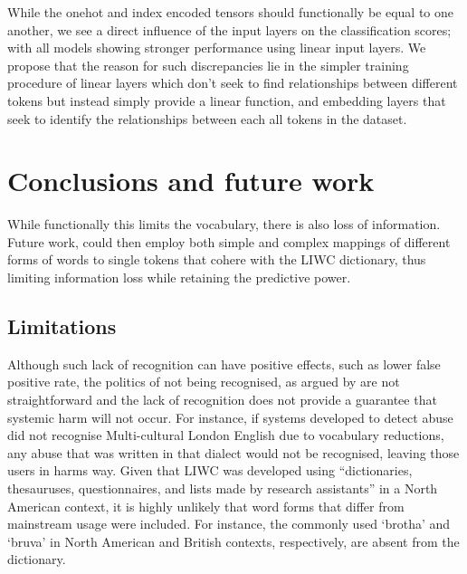 
While the onehot and index encoded tensors should functionally be equal to one another, we see a direct influence of the input layers on the classification scores; with all models showing stronger performance using linear input layers. We propose that the reason for such discrepancies lie in the simpler training procedure of linear layers which don't seek to find relationships between different tokens but instead simply provide a linear function, and embedding layers that seek to identify the relationships between each all tokens in the dataset.

\section{Conclusions and future work}

While functionally this limits the vocabulary, there is also loss of information. Future work, could then employ both simple and complex mappings of different forms of words to single tokens that cohere with the LIWC dictionary, thus limiting information loss while retaining the predictive power.

\subsection{Limitations}
Although such lack of recognition can have positive effects, such as lower false positive rate, the politics of not being recognised, as argued by \citet{Benjamin:2019} are not straightforward and the lack of recognition does not provide a guarantee that systemic harm will not occur. For instance, if systems developed to detect abuse did not recognise Multi-cultural London English due to vocabulary reductions, any abuse that was written in that dialect would not be recognised, leaving those users in harms way. Given that LIWC was developed using ``dictionaries, thesauruses, questionnaires, and lists made by research assistants'' \citep{Tauscik:2010} in a North American context, it is highly unlikely that word forms that differ from mainstream usage were included. For instance, the commonly used `brotha' and `bruva' in North American and British contexts, respectively, are absent from the dictionary.
